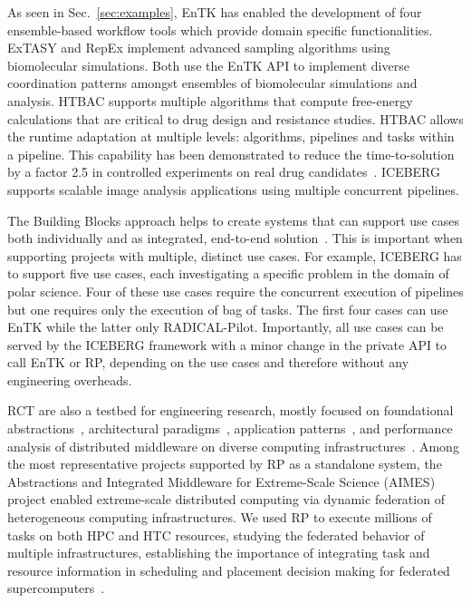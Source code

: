 \documentclass[preprint,12pt, a4paper]{elsarticle}
\begin{document}
As seen in Sec.~\ref{sec:examples}, EnTK has enabled the development of four
ensemble-based workflow tools which provide domain specific functionalities.
ExTASY and RepEx implement advanced sampling algorithms using biomolecular
simulations. Both use the EnTK API to implement  diverse coordination patterns
amongst ensembles of biomolecular simulations and analysis. HTBAC supports
multiple algorithms that compute free-energy calculations that are critical to
drug design and resistance studies. HTBAC allows the runtime adaptation at
multiple levels: algorithms, pipelines and tasks within a pipeline. This
capability has been demonstrated to reduce the time-to-solution by a factor
2.5 in controlled experiments on real drug
candidates~\citep{dakka2018concurrent}.
ICEBERG~\cite{paraskevakos2019workflow} supports scalable image analysis
applications using multiple concurrent pipelines.

The Building Blocks approach helps to create systems that can support use
cases both individually and as integrated, end-to-end
solution~\cite{turilli2019middleware}. This is important when supporting
projects with multiple, distinct use cases. For example, ICEBERG has to
support five use cases, each investigating a specific problem in the domain
of polar science. Four of these use cases require the concurrent execution of
pipelines but one requires only the execution of bag of tasks. The first four
cases can use EnTK while the latter only RADICAL-Pilot. Importantly, all use
cases can be served by the ICEBERG framework with a minor change in the
private API to call EnTK or RP, depending on the use cases and therefore
without any engineering overheads.


RCT are also a testbed for engineering research, mostly focused on
foundational abstractions~\cite{turilli2017evaluating}, architectural
paradigms~\cite{turilli2018comprehensive}, application
patterns~\cite{balasubramanian2016extasy,balasubramanian2018harnessing}, and
performance analysis of distributed middleware on diverse computing
infrastructures~\cite{turilli2017evaluating,dakka2018high}. Among the most
representative projects supported by RP as a standalone system, the
Abstractions and Integrated Middleware for Extreme-Scale Science (AIMES)
project enabled extreme-scale distributed computing via dynamic federation of
heterogeneous computing infrastructures. We used RP to execute millions of
tasks on both HPC and HTC resources, studying the federated behavior of
multiple infrastructures, establishing the importance of integrating task and
resource information in scheduling and placement decision making for
federated supercomputers~\cite{turilli2016integrating}.
\end{document}

